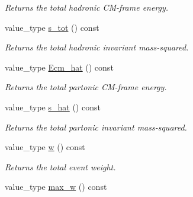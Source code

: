 \begin{DoxyCompactItemize}
\begin{DoxyCompactList}\small\item\em Returns the total hadronic C\-M-\/frame energy. \end{DoxyCompactList}\item 
\hypertarget{a00430_ac6e6f23d9fce776fe68c6e186053e4f2}{value\-\_\-type \hyperlink{a00430_ac6e6f23d9fce776fe68c6e186053e4f2}{s\-\_\-tot} () const }\label{a00430_ac6e6f23d9fce776fe68c6e186053e4f2}

\begin{DoxyCompactList}\small\item\em Returns the total hadronic invariant mass-\/squared. \end{DoxyCompactList}\item 
\hypertarget{a00430_a54c63596949efb310049f3e28d216fa6}{value\-\_\-type \hyperlink{a00430_a54c63596949efb310049f3e28d216fa6}{Ecm\-\_\-hat} () const }\label{a00430_a54c63596949efb310049f3e28d216fa6}

\begin{DoxyCompactList}\small\item\em Returns the total partonic C\-M-\/frame energy. \end{DoxyCompactList}\item 
\hypertarget{a00430_aa286957f1fbbf236cbc6b92c53137054}{value\-\_\-type \hyperlink{a00430_aa286957f1fbbf236cbc6b92c53137054}{s\-\_\-hat} () const }\label{a00430_aa286957f1fbbf236cbc6b92c53137054}

\begin{DoxyCompactList}\small\item\em Returns the total partonic invariant mass-\/squared. \end{DoxyCompactList}\item 
\hypertarget{a00430_ad8f5784273d95bcea8ef4e61cff3bc3e}{value\-\_\-type \hyperlink{a00430_ad8f5784273d95bcea8ef4e61cff3bc3e}{w} () const }\label{a00430_ad8f5784273d95bcea8ef4e61cff3bc3e}

\begin{DoxyCompactList}\small\item\em Returns the total event weight. \end{DoxyCompactList}\item 
\hypertarget{a00430_a7e6ff5ed5c6e4b0774bfd5067cc5a54e}{value\-\_\-type \hyperlink{a00430_a7e6ff5ed5c6e4b0774bfd5067cc5a54e}{max\-\_\-w} () const }\label{a00430_a7e6ff5ed5c6e4b0774bfd5067cc5a54e}


\end{DoxyCompactItemize}
